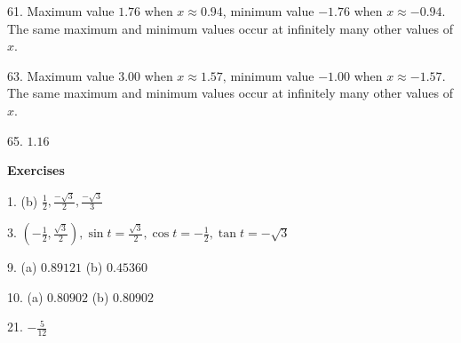 61. Maximum value $1.76$ when $x \approx 0.94$, minimum value $ -1.76$ when $x \approx  -0.94\text{.}$ The same maximum and minimum values occur at infinitely many other values
of $x$. 

63. Maximum value $3.00$ when $x \approx 1.57\text{,}$ minimum value $ -1.00$ when $x \approx  -1.57$. The same maximum and minimum values occur at infinitely many other values of $x$. 

65. $1.16$ 

\textbf{Exercises} 
\begin{multicols}{2}

1. (b) $\frac{1}{2} ,\frac{ -\sqrt{3}}{2} ,\frac{ -\sqrt{3}}{3}$ 

3. $\left ( -\frac{1}{2} ,\frac{\sqrt{3}}{2}\right ) ,\sin  t =\frac{\sqrt{3}}{2} ,\cos  t = -\frac{1}{2} ,\tan  t = -\sqrt{3}$ 

9. (a) $0.89121$ (b) $0.45360$ 

10. (a) $0.80902$ (b) $0.80902$ 

21. $ -\frac{5}{12}$ 
\end{multicols}


